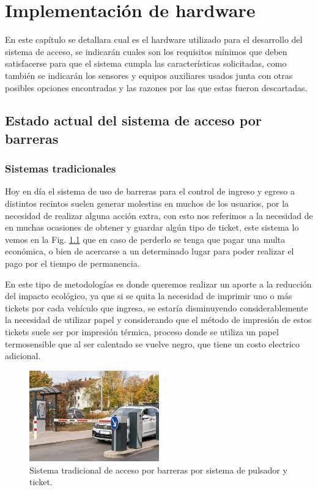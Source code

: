 \chapter{Implementación de hardware}
En este capítulo se detallara cual es el hardware utilizado para el desarrollo del sistema de acceso, se indicarán cuales
son los requisitos mínimos que deben satisfacerse para que el sistema cumpla las características solicitadas, como
también se indicarán los sensores y equipos auxiliares usados junta con otras posibles opciones encontradas y las
razones por las que estas fueron descartadas.


\section{Estado actual del sistema de acceso por barreras}

\subsection{Sistemas tradicionales}

Hoy en día el sistema de uso de barreras para el control de ingreso y egreso a distintos recintos suelen generar molestias
en muchos de los usuarios, por la necesidad de realizar alguna acción extra, con esto nos referimos a la necesidad de
en muchas ocasiones de obtener y guardar algún tipo de ticket, este sistema lo vemos en la Fig. \ref{fig:sistema-tradicional}
 que en caso de perderlo se tenga que pagar una multa económica, o bien de acercarse a un determinado lugar para poder realizar el pago por el tiempo de permanencia.

En este tipo de metodologías es donde queremos realizar un aporte a la reducción del impacto ecológico, ya que si se quita
la necesidad de imprimir uno o más tickets por cada vehículo que ingresa, se estaría disminuyendo considerablemente la
necesidad de utilizar papel y considerando que el método de impresión de estos tickets suele ser por impresión térmica,
proceso donde se utiliza un papel termosensible que al ser calentado se vuelve negro, que tiene un costo electrico
adicional.
\begin{figure}
    \centering
    \includegraphics[width=0.5\textwidth]{imgs/sistema-control-acceso-barreras.jpg}
    \caption{Sistema tradicional de acceso por barreras por sistema de pulsador y ticket.}
    \label{fig:sistema-tradicional}
\end{figure}

